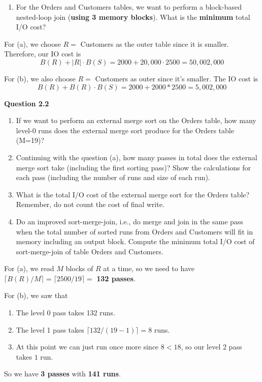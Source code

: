 \begin{example}
\begin{enumerate}[label=(\alph*)]
      \item For the Orders and Customers tables, we want to perform a block-based nested-loop join (\textbf{using 3 memory blocks}). What is the \textbf{minimum} total I/O cost?
    \end{enumerate}

    For (a), we choose $R = $ Customers as the outer table since it is smaller. Therefore, our IO cost is 
    \begin{equation}
      B(R) + |R| \cdot B(S)  = 2000 + 20,000 \cdot 2500 = 50,002,000
    \end{equation}

    For (b), we also choose $R = $ Customers as outer since it's smaller. The IO cost is 
    \begin{equation}
      B(R) + B(R) \cdot B(S)= 2000 + 2000 * 2500 = 5,002,000
    \end{equation}

    \vspace{1em}
    \noindent\textbf{Question 2.2}
    \begin{enumerate}[label=(\alph*)]
      \item If we want to perform an external merge sort on the Orders table, how many level-0 runs does the external merge sort produce for the Orders table (M=19)?
      
      \item Continuing with the question (a), how many passes in total does the external merge sort take (including the first sorting pass)? Show the calculations for each pass (including the number of runs and size of each run).
      
      \item What is the total I/O cost of the external merge sort for the Orders table? Remember, do not count the cost of final write.
      
      \item Do an improved sort-merge-join, i.e., do merge and join in the same pass when the total number of sorted runs from Orders and Customers will fit in memory including an output block. Compute the minimum total I/O cost of sort-merge-join of table Orders and Customers.
    \end{enumerate}

    For (a), we read $M$ blocks of $R$ at a time, so we need to have $\lceil B(R) / M \rceil = \lceil 2500 / 19 \rceil =$ \textbf{132 passes}. 

    For (b), we saw that 
    \begin{enumerate}
      \item The level 0 pass takes 132 runs. 
      \item The level 1 pass takes $\lceil 132 / (19 - 1) \rceil = 8$ runs. 
      \item At this point we can just run once more since $8 < 18$, so our level 2 pass takes $1$ run. 
    \end{enumerate}
    So we have \textbf{3 passes} with \textbf{141 runs}. 


\end{example}

